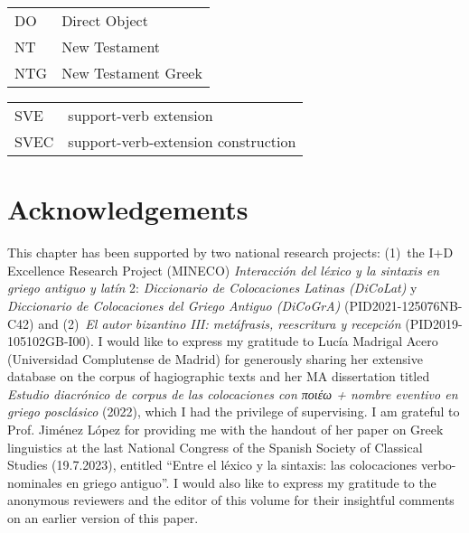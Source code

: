 \documentclass[output=paper,colorlinks,citecolor=brown]{langscibook}
\begin{document}
\begin{tabularx}{.45\textwidth}{lQ}
DO & Direct Object \\
NT & New Testament \\
NTG & New Testament Greek \\
\end{tabularx}
\begin{tabularx}{.45\textwidth}{lQ}
SVE & support-verb extension \\
SVEC & support-verb-extension construction \\
\end{tabularx}

\section*{Acknowledgements}\label{acknowledgements}

This chapter has been supported by two national research projects: (1)~the I+D Excellence
Research Project (MINECO) \emph{Interacción del léxico y la sintaxis en griego antiguo y
  latín} 2: \emph{Diccionario de Colocaciones Latinas (DiCoLat)} y \emph{Diccionario de
  Colocaciones del Griego Antiguo (DiCoGrA)} (PID2021-125076NB-C42) and (2)~\emph{El autor
  bizantino III: metáfrasis, reescritura y recepción} (PID2019-105102GB-I00). I would like
to express my gratitude to Lucía Madrigal Acero (Universidad Complutense de Madrid) for
generously sharing her extensive database on the corpus of hagiographic texts and her MA
dissertation titled \emph{Estudio diacrónico de corpus de las colocaciones con ποιέω +
  nombre eventivo en griego posclásico} (2022), which I had the privilege of supervising.
I am grateful to Prof. Jiménez López for providing me with the handout of her paper on
Greek linguistics at the last National Congress of the Spanish Society of Classical
Studies (19.7.2023), entitled ``Entre el léxico y la sintaxis: las colocaciones
verbo-nominales en griego antiguo''. I would also like to express my gratitude to the
anonymous reviewers and the editor of this volume for their insightful comments on an
earlier version of this paper.



 \sloppy
 \printbibliography[heading=subbibliography,notkeyword=this]
\end{document}
